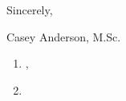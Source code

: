 \begin{center}
\begin{minipage}{\textwidth}
  \vspace{6mm}
  
  Sincerely, \\ \vspace{-4mm}
  
  
  Casey Anderson, M.Sc.
  
  \end{minipage}
\end{center}

\vspace{2mm}


\begin{center}
\begin{minipage}{0.95\textwidth}
	\normalsize
	\begin{enumerate}[leftmargin=5mm,itemsep=1mm]
	\item {}, \label{ieee_nss_paper}
	\item {} \label{mcnp_manual}
   \end{enumerate}
\end{minipage}
\end{center}

